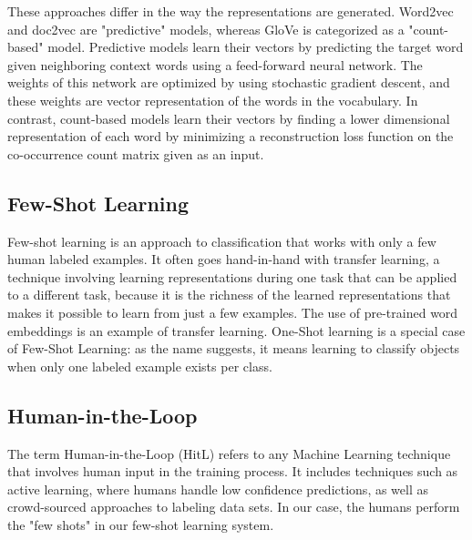\documentclass{article} %
\begin{document}
These approaches differ in the way the representations are generated.  Word2vec and doc2vec are "predictive" models, whereas GloVe is categorized as a "count-based" model.  Predictive models learn their vectors by predicting the target word given neighboring context words using a feed-forward neural network. The weights of this network are optimized by using stochastic gradient descent, and these weights are vector representation of the words in the vocabulary. In contrast, count-based models learn their vectors by finding a lower dimensional representation of each word by minimizing a reconstruction loss function on the co-occurrence count matrix given as an input.

\subsection*{Few-Shot Learning}
Few-shot learning is an approach to classification that works with only a few human labeled examples. It often goes hand-in-hand with transfer learning, a technique involving learning representations during one task that can be applied to a different task, because it is the richness of the learned representations that makes it possible to learn from just a few examples. The use of pre-trained word embeddings is an example of transfer learning. One-Shot learning is a special case of Few-Shot Learning: as the name suggests, it means learning to classify objects when only one labeled example exists per class.

\subsection*{Human-in-the-Loop}
The term Human-in-the-Loop (HitL) refers to any Machine Learning technique that involves human input in the training process. It includes techniques such as active learning, where humans handle low confidence predictions, as well as crowd-sourced approaches to labeling data sets. In our case, the humans perform the "few shots" in our few-shot learning system.
\end{document}
